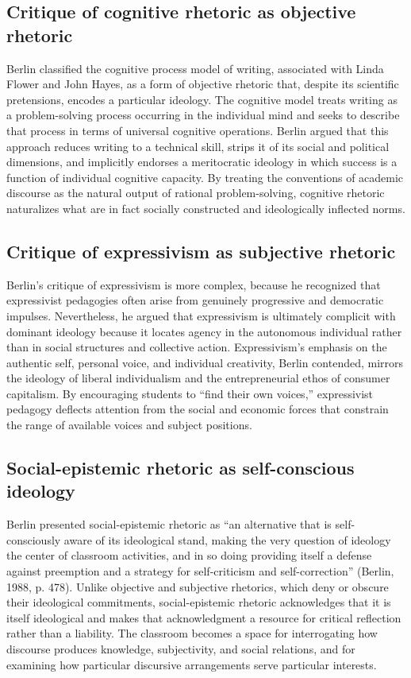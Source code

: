\documentclass[12pt]{article}
\begin{document}
\subsection*{Critique of cognitive rhetoric as objective rhetoric}

Berlin classified the cognitive process model of writing, associated with Linda Flower and John Hayes, as a form of objective rhetoric that, despite its scientific pretensions, encodes a particular ideology. The cognitive model treats writing as a problem-solving process occurring in the individual mind and seeks to describe that process in terms of universal cognitive operations. Berlin argued that this approach reduces writing to a technical skill, strips it of its social and political dimensions, and implicitly endorses a meritocratic ideology in which success is a function of individual cognitive capacity. By treating the conventions of academic discourse as the natural output of rational problem-solving, cognitive rhetoric naturalizes what are in fact socially constructed and ideologically inflected norms.

\subsection*{Critique of expressivism as subjective rhetoric}

Berlin's critique of expressivism is more complex, because he recognized that expressivist pedagogies often arise from genuinely progressive and democratic impulses. Nevertheless, he argued that expressivism is ultimately complicit with dominant ideology because it locates agency in the autonomous individual rather than in social structures and collective action. Expressivism's emphasis on the authentic self, personal voice, and individual creativity, Berlin contended, mirrors the ideology of liberal individualism and the entrepreneurial ethos of consumer capitalism. By encouraging students to ``find their own voices,'' expressivist pedagogy deflects attention from the social and economic forces that constrain the range of available voices and subject positions.

\subsection*{Social-epistemic rhetoric as self-conscious ideology}

Berlin presented social-epistemic rhetoric as ``an alternative that is self-consciously aware of its ideological stand, making the very question of ideology the center of classroom activities, and in so doing providing itself a defense against preemption and a strategy for self-criticism and self-correction'' (Berlin, 1988, p. 478). Unlike objective and subjective rhetorics, which deny or obscure their ideological commitments, social-epistemic rhetoric acknowledges that it is itself ideological and makes that acknowledgment a resource for critical reflection rather than a liability. The classroom becomes a space for interrogating how discourse produces knowledge, subjectivity, and social relations, and for examining how particular discursive arrangements serve particular interests.
\end{document}
